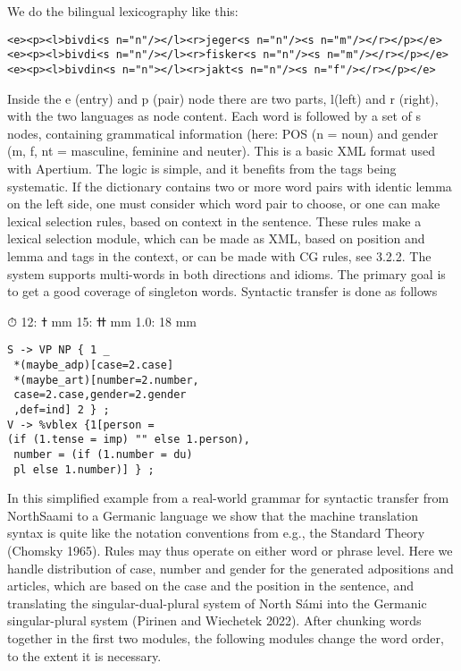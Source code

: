 \documentclass[free]{flammie}
\begin{document}
We do the bilingual lexicography like this:

\begin{verbatim}
<e><p><l>bivdi<s n="n"/></l><r>jeger<s n="n"/><s n="m"/></r></p></e>
<e><p><l>bivdi<s n="n"/></l><r>fisker<s n="n"/><s n="m"/></r></p></e>
<e><p><l>bivdin<s n="n"></l><r>jakt<s n="n"/><s n="f"/></r></p></e>
\end{verbatim}

Inside the e (entry) and p (pair) node there are two parts, l(left) and r (right), with the
two languages as node content. Each word is followed by a set of s nodes, containing
grammatical information (here: POS (n = noun) and gender (m, f, nt = masculine, feminine and neuter). This is a basic XML format used with Apertium. The logic is simple, and
it benefits from the tags being systematic. If the dictionary contains two or more word pairs
with identic lemma on the left side, one must consider which word pair to choose, or one
can make lexical selection rules, based on context in the sentence. These rules make a lexical selection module, which can be made as XML, based on position and lemma and tags
in the context, or can be made with CG rules, see 3.2.2.
The system supports multi-words in both directions and idioms. The primary goal is to
get a good coverage of singleton words. Syntactic transfer is done as follows

⏱
ߙ :12 mm
ߚ :15 mm
1.0: 18 mm

\begin{verbatim}
S -> VP NP { 1 _
 *(maybe_adp)[case=2.case]
 *(maybe_art)[number=2.number,
 case=2.case,gender=2.gender
 ,def=ind] 2 } ;
V -> %vblex {1[person =
(if (1.tense = imp) "" else 1.person),
 number = (if (1.number = du)
 pl else 1.number)] } ;
\end{verbatim}

In this simplified example from a real-world grammar for syntactic transfer from NorthSaami to a Germanic language we show that the machine translation syntax is quite like
the notation conventions from e.g., the Standard Theory (Chomsky 1965). Rules may thus
operate on either word or phrase level. Here we handle distribution of case, number and
gender for the generated adpositions and articles, which are based on the case and the position in the sentence, and translating the singular-dual-plural system of North Sámi into
the Germanic singular-plural system (Pirinen and Wiechetek 2022). After chunking words
together in the first two modules, the following modules change the word order, to the
extent it is necessary.
\end{document}
